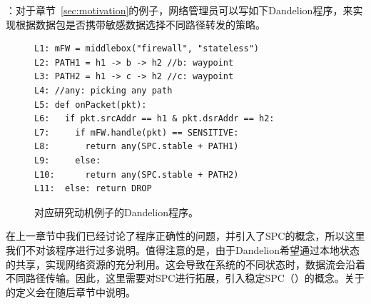 ：对于章节~\ref{sec:motivation}的例子，网络管理员可以写如下Dandelion程序，来实现根据数据包是否携带敏感数据选择不同路径转发的策略。




\begin{figure}[h]
\begin{verbatim}
L1: mFW = middlebox("firewall", "stateless")
L2: PATH1 = h1 -> b -> h2 //b: waypoint
L3: PATH2 = h1 -> c -> h2 //c: waypoint
L4: //any: picking any path
L5: def onPacket(pkt):
L6:   if pkt.srcAddr == h1 & pkt.dsrAddr == h2:
L7:     if mFW.handle(pkt) == SENSITIVE:
L8:       return any(SPC.stable + PATH1)
L9:     else:
L10:      return any(SPC.stable + PATH2)
L11:  else: return DROP
\end{verbatim}
    \caption{对应研究动机例子的Dandelion程序。}
\label{fig:code}
\end{figure}

在上一章节中我们已经讨论了程序正确性的问题，并引入了SPC的概念，所以这里我们不对该程序进行过多说明。值得注意的是，由于Dandelion希望通过本地状态的共享，实现网络资源的充分利用。这会导致在系统的不同状态时，数据流会沿着不同路径传输。因此，这里需要对SPC进行拓展，引入稳定SPC（）的概念。关于的定义会在随后章节中说明。

%



